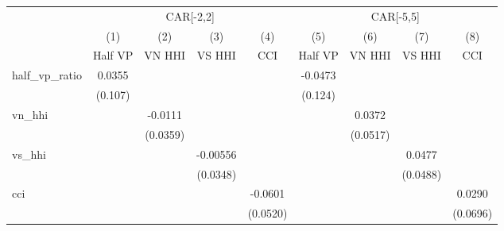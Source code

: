 {
\def\sym#1{\ifmmode^{#1}\else\(^{#1}\)\fi}
\begin{tabular}{l*{8}{c}}
\hline\hline
                    &\multicolumn{4}{c}{CAR[-2,2]}                                                          &\multicolumn{4}{c}{CAR[-5,5]}                                                          \\
                    &\multicolumn{1}{c}{(1)}&\multicolumn{1}{c}{(2)}&\multicolumn{1}{c}{(3)}&\multicolumn{1}{c}{(4)}&\multicolumn{1}{c}{(5)}&\multicolumn{1}{c}{(6)}&\multicolumn{1}{c}{(7)}&\multicolumn{1}{c}{(8)}\\
                    &\multicolumn{1}{c}{Half VP}&\multicolumn{1}{c}{VN HHI}&\multicolumn{1}{c}{VS HHI}&\multicolumn{1}{c}{CCI}&\multicolumn{1}{c}{Half VP}&\multicolumn{1}{c}{VN HHI}&\multicolumn{1}{c}{VS HHI}&\multicolumn{1}{c}{CCI}\\
\hline
half\_vp\_ratio       &      0.0355         &                     &                     &                     &     -0.0473         &                     &                     &                     \\
                    &     (0.107)         &                     &                     &                     &     (0.124)         &                     &                     &                     \\
vn\_hhi              &                     &     -0.0111         &                     &                     &                     &      0.0372         &                     &                     \\
                    &                     &    (0.0359)         &                     &                     &                     &    (0.0517)         &                     &                     \\
vs\_hhi              &                     &                     &    -0.00556         &                     &                     &                     &      0.0477         &                     \\
                    &                     &                     &    (0.0348)         &                     &                     &                     &    (0.0488)         &                     \\
cci                 &                     &                     &                     &     -0.0601         &                     &                     &                     &      0.0290         \\
                    &                     &                     &                     &    (0.0520)         &                     &                     &                     &    (0.0696)         \\

\end{tabular}}
